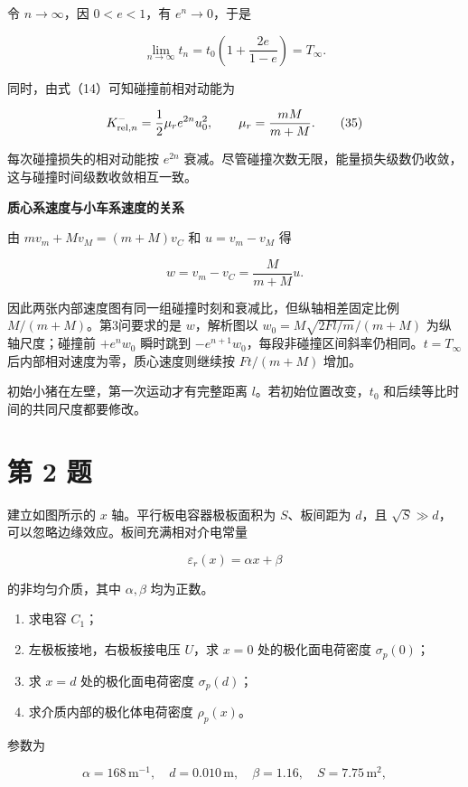 \documentclass[12pt,a4paper,UTF8]{ctexart}
\newcommand{\tightlist}{\setlength{\itemsep}{0pt}\setlength{\parskip}{0pt}}
\begin{document}
令 \(n\to\infty\)，因 \(0<e<1\)，有 \(e^n\to0\)，于是

\[
\lim_{n\to\infty}t_n
=t_0\left(1+\frac{2e}{1-e}\right)
=T_\infty.
\]

同时，由式（14）可知碰撞前相对动能为

\[
K_{{\rm rel},n}^-
=\frac12\mu_r e^{2n}u_0^2,
\qquad
\mu_r=\frac{mM}{m+M}.
\tag{35}
\]

每次碰撞损失的相对动能按 \(e^{2n}\)
衰减。尽管碰撞次数无限，能量损失级数仍收敛，这与碰撞时间级数收敛相互一致。

\textbf{质心系速度与小车系速度的关系}

由 \(mv_m+Mv_M=(m+M)v_C\) 和 \(u=v_m-v_M\) 得

\[w=v_m-v_C=\frac{M}{m+M}u.\]

因此两张内部速度图有同一组碰撞时刻和衰减比，但纵轴相差固定比例
\(M/(m+M)\)。第3问要求的是 \(w\)，解析图以 \(w_0=M\sqrt{2Fl/m}/(m+M)\)
为纵轴尺度；碰撞前 \(+e^nw_0\) 瞬时跳到
\(-e^{n+1}w_0\)，每段非碰撞区间斜率仍相同。\(t=T_\infty\)
后内部相对速度为零，质心速度则继续按 \(Ft/(m+M)\) 增加。

初始小猪在左壁，第一次运动才有完整距离 \(l\)。若初始位置改变，\(t_0\)
和后续等比时间的共同尺度都要修改。

\newpage

\section{第 2 题}\label{ux7b2c-2-ux9898}

建立如图所示的 \(x\) 轴。平行板电容器极板面积为 \(S\)、板间距为
\(d\)，且 \(\sqrt S\gg d\)，可以忽略边缘效应。板间充满相对介电常量

\[
\varepsilon_r(x)=\alpha x+\beta
\]

的非均匀介质，其中 \(\alpha,\beta\) 均为正数。

\begin{enumerate}
\def\labelenumi{\arabic{enumi}.}
\tightlist
\item
  求电容 \(C_1\)；
\item
  左极板接地，右极板接电压 \(U\)，求 \(x=0\) 处的极化面电荷密度
  \(\sigma_p(0)\)；
\item
  求 \(x=d\) 处的极化面电荷密度 \(\sigma_p(d)\)；
\item
  求介质内部的极化体电荷密度 \(\rho_p(x)\)。
\end{enumerate}

参数为

\[
\alpha=168\,\mathrm{m^{-1}},\quad
d=0.010\,\mathrm m,\quad
\beta=1.16,\quad
S=7.75\,\mathrm{m^2},
\]
\end{document}
